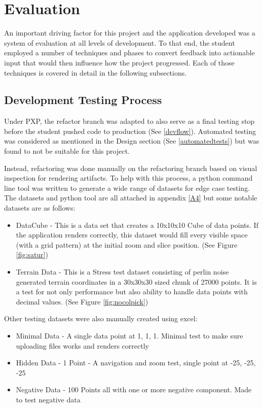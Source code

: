 \section{Evaluation}
An important driving factor for this project and the application developed was a system of evaluation at all levels of development. To that end, the student employed a
number of techniques and phases to convert feedback into actionable input that would then influence how the project progressed. Each of those techniques is covered in detail in the following subsections.

\subsection{Development Testing Process} \label{devtest}
Under PXP, the refactor branch was adapted to also serve as a final testing stop before the student pushed code to production (See \ref{devflow}). Automated testing was considered as mentioned in the Design section (See \ref{automatedtests}) but was found to not be suitable for this project.

Instead, refactoring was done manually on the refactoring branch based on visual inspection for rendering artifacts. To help with this process, a python command line tool was written to generate a wide range of datasets for edge case testing. The datasets and python tool are all attached in appendix \ref{A4} but some notable datasets are as follows:

\begin{itemize}
    \item DataCube - This is a data set that creates a 10x10x10 Cube of data points. If the application renders correctly, this dataset would fill every visible space (with a grid pattern) at the initial zoom and slice position. (See Figure \ref{fig:satur})
    \item Terrain Data - This is a Stress test dataset consisting of perlin noise generated terrain coordinates in a 30x30x30 sized chunk of 27000 points. It is a test for not only performance but also ability to handle data points with decimal values. (See Figure \ref{fig:nocolpick})
\end{itemize}

Other testing datasets were also manually created using excel:
\begin{itemize}
    \item Minimal Data - A single data point at 1, 1, 1. Minimal test to make sure uploading files works and renders correctly
    \item Hidden Data - 1 Point - A navigation and zoom test, single point at -25, -25, -25
    \item Negative Data - 100 Points all with one or more negative component. Made to test negative data
\end{itemize}


